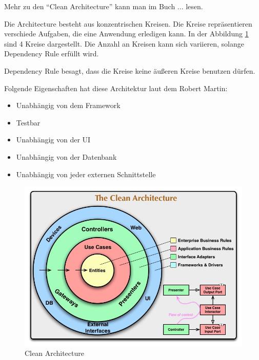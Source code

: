 Mehr zu den ``Clean Architecture'' kann man im Buch ... lesen.

Die Architecture besteht aus konzentrischen Kreisen. Die Kreise repräsentieren verschiede Aufgaben, die eine Anwendung erledigen kann.
In der Abbildung \ref{fig:Clean Architecture} sind 4 Kreise dargestellt. Die Anzahl an Kreisen kann sich variieren, solange Dependency Rule erfüllt wird.

Dependency Rule besagt, dass die Kreise keine äußeren Kreise benutzen dürfen.

Folgende Eigenschaften hat diese Architektur laut dem Robert Martin:
\begin{itemize}
    \item Unabhängig von dem Framework
    \item Testbar
    \item Unabhängig von der UI
    \item Unabhängig von der Datenbank
    \item Unabhängig von jeder externen Schnittstelle
\end{itemize}

\begin{figure}[H]
    \centering
    \includegraphics[width=1\textwidth]{./images/CleanArchitecture.jpg}
    \caption[Clean Architecture]{Clean Architecture \footnotemark}
    \label{fig:Clean Architecture}
\end{figure}

